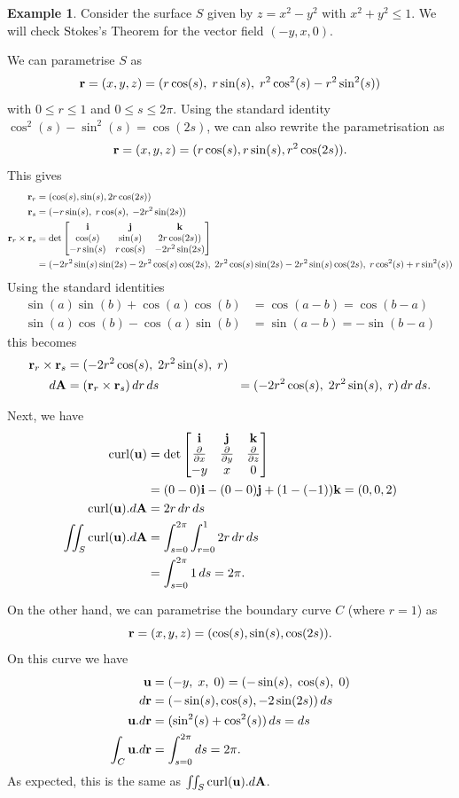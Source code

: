 \documentclass[reqno]{amsart}
\theoremstyle{definition}
\newtheorem{example}[theorem]{Example}
\begin{document}
\begin{example}
 Consider the surface $S$ given by $z=x^2-y^2$ with $x^2+y^2\leq 1$.
 We will check Stokes's Theorem for the vector field $(-y,x,0)$.  

 We can parametrise $S$ as 
 \[ \mathbf{r} = (x,y,z) = (r\cos(s),\;r\sin(s),\;r^2\cos^2(s)-r^2\sin^2(s))
 \]
 with $0\leq r\leq 1$ and $0\leq s\leq 2\pi$.  Using the standard
 identity $\cos^2(s)-\sin^2(s)=\cos(2s)$, we can also rewrite the
 parametrisation as  
 \[ \mathbf{r} = (x,y,z) = (r\cos(s),r\sin(s),r^2\cos(2s)). \]
 This gives 
 \begin{align*}
  \mathbf{r}_r &= (\cos(s),\sin(s),2r\cos(2s)) \\
  \mathbf{r}_s &= (-r\sin(s),\;r\cos(s),\;-2r^2\sin(2s)) \\
  \mathbf{r}_r\times\mathbf{r}_s 
   &= \det\left[\begin{matrix} \mathbf{i} & \mathbf{j} & \mathbf{k} \\
       \cos(s) & \sin(s) & 2r\cos(2s)) \\
       -r\sin(s) & r\cos(s) & -2r^2\sin(2s) \end{matrix}\right] \\
   &= (-2r^2\sin(s)\sin(2s)-2r^2\cos(s)\cos(2s),\;
       2r^2\cos(s)\sin(2s)-2r^2\sin(s)\cos(2s),\;
       r\cos^2(s)+r\sin^2(s))
 \end{align*}
 Using the standard identities
 \begin{align*}
  \sin(a)\sin(b)+\cos(a)\cos(b) &= \cos(a-b) = \cos(b-a) \\
  \sin(a)\cos(b)-\cos(a)\sin(b) &= \sin(a-b) = -\sin(b-a) 
 \end{align*}
 this becomes
 \begin{align*}
  \mathbf{r}_r\times\mathbf{r}_s 
   &= (-2r^2\cos(s),\;2r^2\sin(s),\;r) \\
  d\mathbf{A} &= (\mathbf{r}_r\times\mathbf{r}_s)\,dr\,ds 
   &= (-2r^2\cos(s),\;2r^2\sin(s),\;r)\,dr\,ds.
 \end{align*}

 Next, we have 
 \begin{align*}
  \operatorname{curl}(\mathbf{u}) 
   &= \det\left[\begin{matrix}
        \mathbf{i}  & \mathbf{j}  & \mathbf{k}  \\
        \frac{\partial}{\partial x} & \frac{\partial}{\partial y} & \frac{\partial}{\partial z} \\
        -y   & x    & 0
      \end{matrix}\right] \\
   &= (0-0)\mathbf{i} - (0-0)\mathbf{j} + (1-(-1))\mathbf{k} 
    = (0,0,2) \\
  \operatorname{curl}(\mathbf{u}).d\mathbf{A} 
   &=  2r\,dr\,ds \\
  \iint_S\operatorname{curl}(\mathbf{u}).d\mathbf{A} 
   &= \int_{s=0}^{2\pi}\int_{r=0}^1 2r\,dr\,ds \\
   &= \int_{s=0}^{2\pi}1\,ds = 2\pi.
 \end{align*}

 On the other hand, we can parametrise the boundary curve $C$ (where
 $r=1$) as 
 \[ \mathbf{r} = (x,y,z) = (\cos(s),\sin(s),\cos(2s)). \]
 On this curve we have
 \begin{align*}
  \mathbf{u} &= (-y,\;x,\;0) = (-\sin(s),\;\cos(s),\;0) \\
  d\mathbf{r} &= (-\sin(s),\cos(s),-2\sin(2s))\,ds \\
  \mathbf{u}.d\mathbf{r} &= (\sin^2(s) + \cos^2(s))\,ds = ds \\
  \int_C \mathbf{u}.d\mathbf{r} &= \int_{s=0}^{2\pi} ds = 2\pi.
 \end{align*}
 As expected, this is the same as $\iint_S\operatorname{curl}(\mathbf{u}).d\mathbf{A}$.
\end{example}
\end{document}
